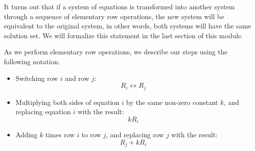 \documentclass{ximera}
\begin{document}
It turns out that if a system of equations is transformed into another system through a sequence of elementary row operations, the new system will be equivalent to the original system, in other words, both systems will have the same solution set.  We will formalize this statement in the last section of this module.

\begin{notation}
As we perform elementary row operations, we describe our steps using the following notation.
\begin{itemize}
\item 
Switching row $i$ and row $j$: $$R_i\leftrightarrow R_j$$
\item Multiplying both sides of equation $i$ by the same non-zero constant $k$, and replacing equation $i$ with the result:
$$kR_i$$
\item 
Adding $k$ times row $i$ to row $j$, and replacing row $j$ with the result:
$$R_j+kR_i$$
\end{itemize}

\end{notation}
\end{document}
